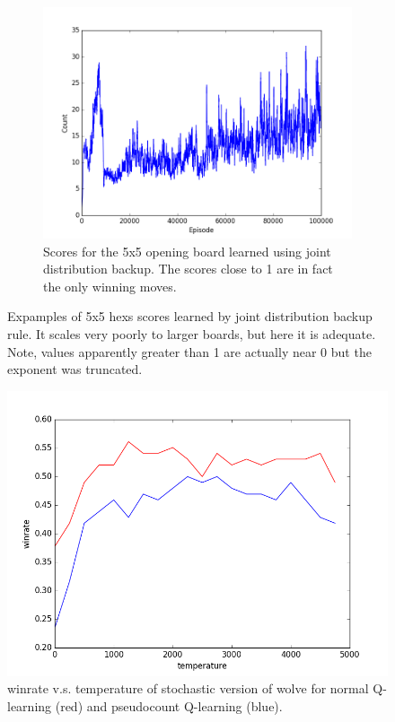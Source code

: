 \documentclass{article}
\begin{document}
\begin{figure}[!ht]
\begin{subfigure}[t]{.45\textwidth}
  \centering
      \includegraphics[width=1\textwidth]{pics/7x7_count_count.png}
  \caption{Scores for the 5x5 opening board learned using joint distribution backup. The scores close to 1 are in fact the only winning moves.}
  \label{fig:5x5_1}
\end{subfigure}\hfill
\caption{Expamples of 5x5 hexs scores learned by joint distribution backup rule. It scales very poorly to larger boards, but here it is adequate. Note, values  apparently greater than 1 are actually near 0 but the exponent was truncated.}
\label{fig:5x5}
\end{figure}

\begin{figure}[!ht]
\centering
\includegraphics[width=1\textwidth]{pics/wolve_temp.png}
\caption{winrate v.s. temperature of stochastic version of wolve for normal Q-learning (red) and pseudocount Q-learning (blue).}
\end{figure}
\end{document}
